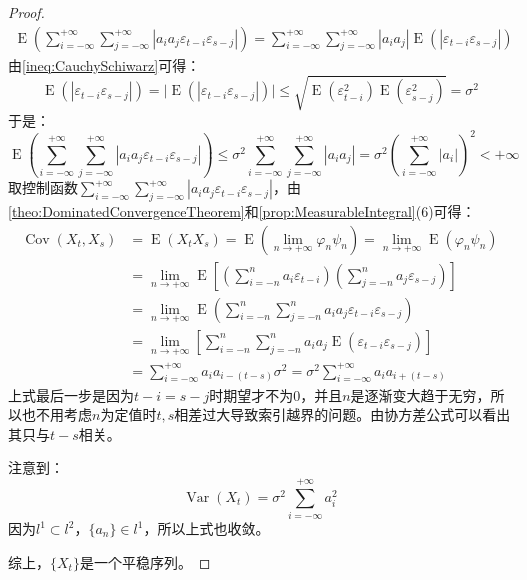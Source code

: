 \begin{proof}
\begin{align*}
		\operatorname{E}\left(\sum_{i=-\infty}^{+\infty}\sum_{j=-\infty}^{+\infty}|a_ia_j\varepsilon_{t-i}\varepsilon_{s-j}|\right)=\sum_{i=-\infty}^{+\infty}\sum_{j=-\infty}^{+\infty}|a_ia_j|\operatorname{E}(|\varepsilon_{t-i}\varepsilon_{s-j}|)
	\end{align*}
	由\cref{ineq:CauchySchiwarz}可得：
	\begin{equation*}
		\operatorname{E}(|\varepsilon_{t-i}\varepsilon_{s-j}|)=\Big|\operatorname{E}(|\varepsilon_{t-i}\varepsilon_{s-j}|)\Big|\leqslant\sqrt{\operatorname{E}(\varepsilon_{t-i}^2)\operatorname{E}(\varepsilon_{s-j}^2)}=\sigma^2
	\end{equation*}
	于是：
	\begin{equation*}
		\operatorname{E}\left(\sum_{i=-\infty}^{+\infty}\sum_{j=-\infty}^{+\infty}|a_ia_j\varepsilon_{t-i}\varepsilon_{s-j}|\right)\leqslant\sigma^2\sum_{i=-\infty}^{+\infty}\sum_{j=-\infty}^{+\infty}|a_ia_j|=\sigma^2\left(\sum_{i=-\infty}^{+\infty}|a_i|\right)^2<+\infty
	\end{equation*}
	取控制函数$\sum\limits_{i=-\infty}^{+\infty}\sum\limits_{j=-\infty}^{+\infty}|a_ia_j\varepsilon_{t-i}\varepsilon_{s-j}|$，由\cref{theo:DominatedConvergenceTheorem}和\cref{prop:MeasurableIntegral}(6)可得：
	\begin{align*}
		\operatorname{Cov}(X_t,X_s)&=\operatorname{E}(X_tX_s)=\operatorname{E}\left(\lim_{n\to+\infty}\varphi_n\psi_n\right)=\lim_{n\to+\infty}\operatorname{E}(\varphi_n\psi_n) \\
		&=\lim_{n\to+\infty}\operatorname{E}\left[\left(\sum_{i=-n}^{n}a_i\varepsilon_{t-i}\right)\left(\sum_{j=-n}^{n}a_j\varepsilon_{s-j}\right)\right] \\
		&=\lim_{n\to+\infty}\operatorname{E}\left(\sum_{i=-n}^{n}\sum_{j=-n}^{n}a_ia_j\varepsilon_{t-i}\varepsilon_{s-j}\right) \\
		&=\lim_{n\to+\infty}\left[\sum_{i=-n}^{n}\sum_{j=-n}^{n}a_ia_j\operatorname{E}(\varepsilon_{t-i}\varepsilon_{s-j})\right] \\
		&=\sum_{i=-\infty}^{+\infty}a_ia_{i-(t-s)}\sigma^2=\sigma^2\sum_{i=-\infty}^{+\infty}a_ia_{i+(t-s)}
	\end{align*}
	上式最后一步是因为$t-i=s-j$时期望才不为$0$，并且$n$是逐渐变大趋于无穷，所以也不用考虑$n$为定值时$t,s$相差过大导致索引越界的问题。由协方差公式可以看出其只与$t-s$相关。\par
	注意到：
	\begin{equation*}
		\operatorname{Var}(X_t)=\sigma^2\sum_{i=-\infty}^{+\infty}a_i^2
	\end{equation*}
	因为$l^1\subset l^2$，$\{a_n\}\in l^1$，所以上式也收敛。\par
	综上，$\{X_t\}$是一个平稳序列。
\end{proof}
